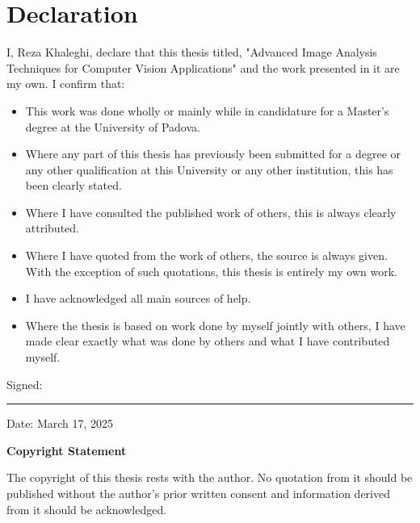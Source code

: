 \chapter*{Declaration}
\thispagestyle{empty}

\vspace{1cm}

I, Reza Khaleghi, declare that this thesis titled, "Advanced Image Analysis Techniques for Computer Vision Applications" and the work presented in it are my own. I confirm that:

\begin{itemize}
    \item This work was done wholly or mainly while in candidature for a Master's degree at the University of Padova.
    \item Where any part of this thesis has previously been submitted for a degree or any other qualification at this University or any other institution, this has been clearly stated.
    \item Where I have consulted the published work of others, this is always clearly attributed.
    \item Where I have quoted from the work of others, the source is always given. With the exception of such quotations, this thesis is entirely my own work.
    \item I have acknowledged all main sources of help.
    \item Where the thesis is based on work done by myself jointly with others, I have made clear exactly what was done by others and what I have contributed myself.
\end{itemize}

\vspace{2cm}

\noindent Signed: \rule{5cm}{0.4pt}

\vspace{1cm}

\noindent Date: March 17, 2025

\vspace{2cm}

\begin{center}
    \textbf{Copyright Statement}
\end{center}

\noindent The copyright of this thesis rests with the author. No quotation from it should be published without the author's prior written consent and information derived from it should be acknowledged.
